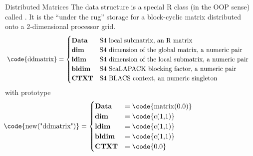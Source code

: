 \begin{frame}
  \begin{block}{Distributed Matrices}\pause
  The data structure is a special R class (in the OOP sense) called 
.  It is the ``under the rug'' storage for a block-cyclic matrix 
distributed onto a 2-dimensional processor grid.\\[.4cm]
{\tiny
\begin{align*}
\hspace{.1cm}\text{\code{ddmatrix}}&=\begin{cases}
 $\textbf{Data}$ & $S4 local submatrix, an R matrix$\\
 $\textbf{dim}$ & $S4 dimension of the global matrix, a numeric pair$\\
 $\textbf{ldim}$ & $S4 dimension of the local submatrix, a numeric pair$\\
 $\textbf{bldim}$ & $S4 ScaLAPACK blocking factor, a numeric pair$\\
 $\textbf{CTXT}$ & $S4 BLACS context, an numeric singleton$
 \end{cases}
\end{align*}
}with prototype{\tiny
\begin{align*}
\hspace{-2.9cm}\text{\code{new("ddmatrix")}}&=\begin{cases}
 $\textbf{Data}$ & =\text{\code{matrix(0.0)}}\\
 $\textbf{dim}$ & =\text{\code{c(1,1)}}\\
 $\textbf{ldim}$ & =\text{\code{c(1,1)}}\\
 $\textbf{bldim}$ & =\text{\code{c(1,1)}}\\
 $\textbf{CTXT}$ & =\text{\code{0.0}}
 \end{cases}
\end{align*}
}
  \end{block}
\end{frame}


